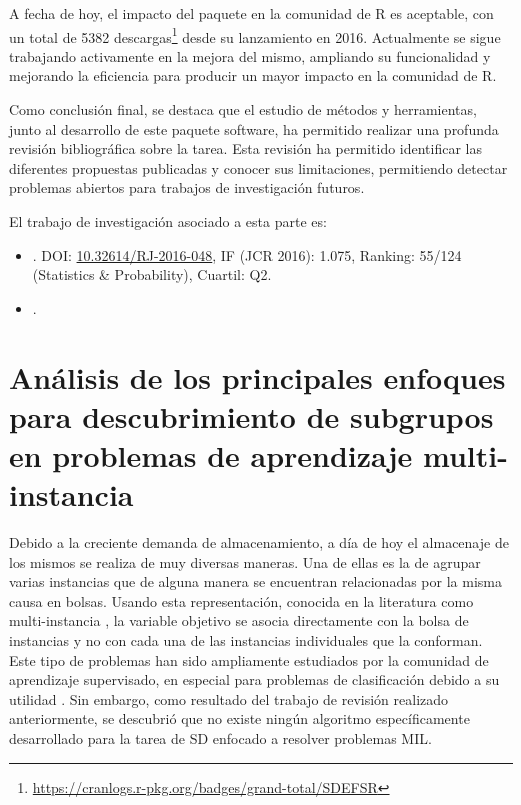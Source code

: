 \documentclass[c5paper,10pt,twoside]{book}	   	%
\newcommand{\doi}[1]{\href{https://doi.org/#1}{#1}}
\begin{document}
A fecha de hoy, el impacto del paquete en la comunidad de R es aceptable, con un total de 5382 descargas\footnote{\url{https://cranlogs.r-pkg.org/badges/grand-total/SDEFSR}} desde su lanzamiento en 2016. Actualmente se sigue trabajando activamente en la mejora del mismo, ampliando su funcionalidad y mejorando la eficiencia para producir un mayor impacto en la comunidad de R.


Como conclusión final, se destaca que el estudio de métodos y herramientas, junto al desarrollo de este paquete software, ha permitido realizar una profunda revisión bibliográfica sobre la tarea. Esta revisión ha permitido identificar las diferentes propuestas publicadas y conocer sus limitaciones, permitiendo detectar problemas abiertos para trabajos de investigación futuros.

El trabajo de investigación asociado a esta parte es:

\begin{itemize}
	\item {}. DOI: \doi{10.32614/RJ-2016-048}, IF (JCR 2016): 1.075, Ranking: 55/124 (Statistics \& Probability), Cuartil: Q2. 

\item {}.
\end{itemize}



\section{Análisis de los principales enfoques para descubrimiento de subgrupos en problemas de aprendizaje multi-instancia} \label{sec:MIL}

Debido a la creciente demanda de almacenamiento, a día de hoy el almacenaje de los mismos se realiza de muy diversas maneras. Una de ellas es la de agrupar varias instancias que de alguna manera se encuentran relacionadas por la misma causa en bolsas. Usando esta representación, conocida en la literatura como multi-instancia \cite{HerreraVBCZSV16}, la variable objetivo se asocia directamente con la bolsa de instancias y no con cada una de las instancias individuales que la conforman. Este tipo de problemas han sido ampliamente estudiados por la comunidad de aprendizaje supervisado, en especial para problemas de clasificación debido a su utilidad \cite{Amores13}. Sin embargo, como resultado del trabajo de revisión realizado anteriormente, se descubrió que no existe ningún algoritmo específicamente desarrollado para la tarea de \ac{SD} enfocado a resolver problemas \ac{MIL}. 
\end{document}
